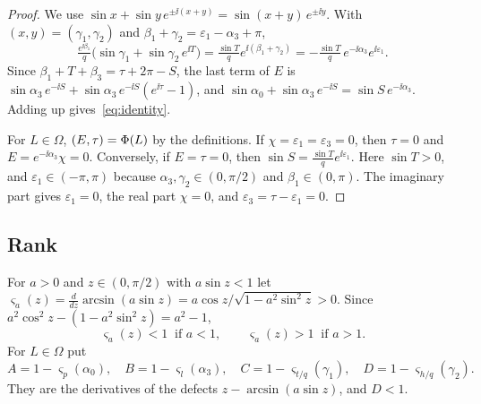 \begin{proof}
We use $\sin x+\sin y\,e^{\pm\ii(x+y)}=\sin(x+y)\,e^{\pm\ii y}$. With
$(x,y)=(\gamma_1,\gamma_2)$ and $\beta_1+\gamma_2=\varepsilon_1-\alpha_3+\pi$,
\[
  \tfrac{e^{\ii\beta_1}}{q}\bigl(\sin\gamma_1+\sin\gamma_2\,e^{\ii T}\bigr)
  =\tfrac{\sin T}{q}e^{\ii(\beta_1+\gamma_2)}
  =-\tfrac{\sin T}{q}\,e^{-\ii\alpha_3}e^{\ii\varepsilon_1}.
\]
Since $\beta_1+T+\beta_3=\tau+2\pi-S$, the last term of $E$ is
$\sin\alpha_3\,e^{-\ii S}+\sin\alpha_3\,e^{-\ii S}(e^{\ii\tau}-1)$, and
$\sin\alpha_0+\sin\alpha_3\,e^{-\ii S}=\sin S\,e^{-\ii\alpha_3}$. Adding up
gives~\eqref{eq:identity}.

For $L\in\Omega$, $(E,\tau)=\Phi(L)$ by the definitions. If
$\chi=\varepsilon_1=\varepsilon_3=0$, then $\tau=0$ and $E=e^{-\ii\alpha_3}\chi=0$.
Conversely, if $E=\tau=0$, then $\sin S=\frac{\sin T}{q}e^{\ii\varepsilon_1}$.
Here $\sin T>0$, and $\varepsilon_1\in(-\pi,\pi)$ because
$\alpha_3,\gamma_2\in(0,\pi/2)$ and $\beta_1\in(0,\pi)$. The imaginary part
gives $\varepsilon_1=0$, the real part $\chi=0$, and
$\varepsilon_3=\tau-\varepsilon_1=0$.
\end{proof}

\subsection{Rank}

For $a>0$ and $z\in(0,\pi/2)$ with $a\sin z<1$ let
$\varsigma_a(z)=\frac{d}{dz}\arcsin(a\sin z)=a\cos z/\sqrt{1-a^2\sin^2z}>0$.
Since $a^2\cos^2z-(1-a^2\sin^2z)=a^2-1$,
\begin{equation}\label{eq:slope}
  \varsigma_a(z)<1\ \text{ if } a<1,\qquad
  \varsigma_a(z)>1\ \text{ if } a>1 .
\end{equation}
For $L\in\Omega$ put
\[
  A=1-\varsigma_p(\alpha_0),\quad B=1-\varsigma_l(\alpha_3),\quad
  C=1-\varsigma_{t/q}(\gamma_1),\quad D=1-\varsigma_{h/q}(\gamma_2).
\]
They are the derivatives of the defects $z-\arcsin(a\sin z)$, and $D<1$.

